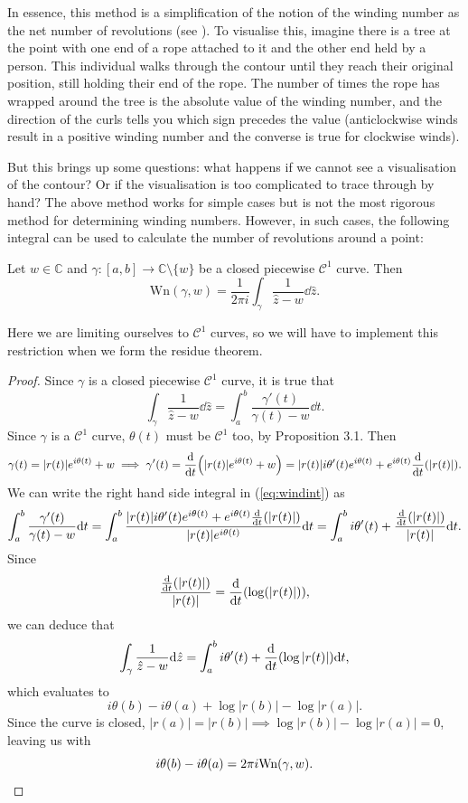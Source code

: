 \documentclass[a4paper]{article}
\def\Wind{\text{Wn}}
\begin{document}
In essence, this method is a simplification of the notion of the winding number as the net number of revolutions (see \citep[p.338]{Needham}). To visualise this, imagine there is a tree at the point with one end of a rope attached to it and the other end held by a person. This individual walks through the contour until they reach their original position, still holding their end of the rope. The number of times the rope has wrapped around the tree is the absolute value of the winding number, and the direction of the curls tells you which sign precedes the value (anticlockwise winds result in a positive winding number and the converse is true for clockwise winds).

But this brings up some questions: what happens if we cannot see a visualisation of the contour? Or if the visualisation is too complicated to trace through by hand? The above method works for simple cases but is not the most rigorous method for determining winding numbers. However, in such cases, the following integral can be used to calculate the number of revolutions around a point:

\begin{theorem}{\citep[p.115]{Ahlfors}}{} \label{thm:windingnumberint}
 Let $w \in \mathbb{C}$ and $\gamma: [a,b] \rightarrow \mathbb{C} \setminus \{w\}$ be a closed piecewise $\mathcal{C}^{1}$ curve. Then
\[ \Wind (\gamma,w) =\frac{1}{2\pi i} \int_{\gamma} { \frac{1}{\hat{z}-w} \dd \hat{z}}. \] 

\end{theorem}

Here we are limiting ourselves to $\mathcal{C}^{1}$ curves, so we will have to implement this restriction when we form the residue theorem.

\begin{proof}
Since $\gamma $ is a closed piecewise $\mathcal{C}^{1}$ curve, it is true that
\begin{equation}\label{eq:windint}
\int_\gamma { \frac{1}{\hat{z}-w} \dd \hat{z}} = \int_a^b { \frac{\gamma'(t)}{\gamma(t)-w} \dd t}.
\end{equation} 
Since $\gamma$ is a $\mathcal{C}^{1}$ curve, $\theta(t)$ must be $\mathcal{C}^{1}$ too, by Proposition 3.1. Then
\[\gamma(t) = |r(t)|e^{i\theta(t)}+w \implies \gamma'(t) = \dv{t} (|r(t)|e^{i\theta(t)}+w) = |r(t)|i\theta'(t)e^{i\theta(t)} + e^{i\theta(t)}\dv{t} (|r(t)|).\]
We can write the right hand side integral in (\ref{eq:windint}) as
\[\int_a^b { \frac{\gamma'(t)}{\gamma(t)-w} \dd t} = \int_a^b { \frac{|r(t)|i\theta'(t)e^{i\theta(t)} + e^{i\theta(t)}\dv{t} (|r(t)|)}{|r(t)|e^{i\theta(t)}} \dd t} =
\int_a^b { i\theta'(t)+\frac{\dv{t} (|r(t)|)}{|r(t)|}}\dd t.\]
Since 
\[\frac{\dv{t} (|r(t)|)}{|r(t)|} = \dv{t} (\log(|r(t)|)),\]
we can deduce that
\[ \int_\gamma { \frac{1}{\hat{z}-w} \dd \hat{z}} = \int_a^b { i\theta'(t)+\dv{t} (\log|r(t)|)\dd t},\]
which evaluates to
\[  i\theta(b) - i\theta(a) + \log|r(b)| - \log|r(a)|.\]
Since the curve is closed, $|r(a)|=|r(b)| \implies \log|r(b)| - \log|r(a)|=0$, leaving us with
\[ i\theta(b) - i\theta(a)  = 2\pi i \Wind (\gamma,w). \qedhere \]

\end{proof} 
\end{document}

